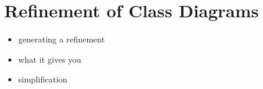 \section{Refinement of Class Diagrams}
\label{sec:classdiagrams-refinement}


\begin{itemize}
	
	\item generating a refinement 
	
	\item what it gives you
	
	\item simplification	
	
\end{itemize}